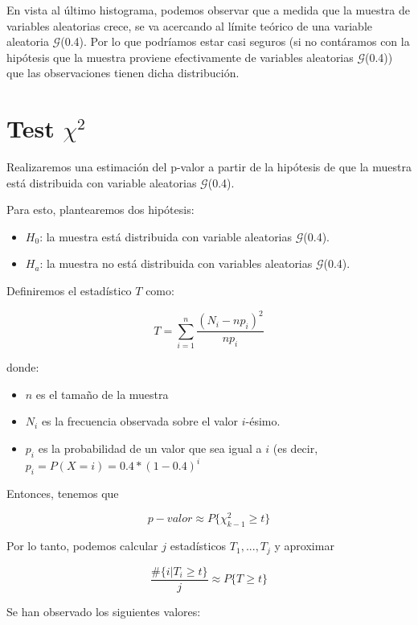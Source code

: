 \documentclass[a4paper,10pt]{article}
\begin{document}
En vista al último histograma, podemos observar que a medida que la muestra de variables aleatorias
crece, se va acercando al límite teórico de una variable aleatoria $\mathcal{G}$(0.4).
Por lo que podríamos estar casi seguros (si no contáramos con la hipótesis que la muestra proviene
efectivamente de variables aleatorias $\mathcal{G}$(0.4)) que las observaciones tienen
dicha distribución.

\pagebreak

\section*{Test $\chi^2$}

\vspace{0.4in}

Realizaremos una estimación del p-valor a partir de la hipótesis de que la muestra está distribuida
con variable aleatorias $\mathcal{G}$(0.4).

Para esto, plantearemos dos hipótesis:

\begin{itemize}
 \item $H_0$: la muestra está distribuida con variable aleatorias $\mathcal{G}$(0.4).
 \item $H_a$: la muestra no está distribuida con variables aleatorias $\mathcal{G}$(0.4).
\end{itemize}

Definiremos el estadístico $T$ como:

\[T = \sum\limits_{i=1}^n \frac{(N_i - n p_i)^2}{n p_i}\]

donde:

\begin{itemize}
 \item $n$ es el tamaño de la muestra
 \item $N_i$ es la frecuencia observada sobre el valor $i$-ésimo.
 \item $p_i$ es la probabilidad de un valor que sea igual a $i$ (es decir, $p_i = P(X=i) = 0.4*(1 - 0.4)^i$
\end{itemize}

Entonces, tenemos que

\[p-valor \approx P\{\chi^2_{k-1} \geq t\}\]

Por lo tanto, podemos calcular $j$ estadísticos $T_1,...,T_j$
y aproximar

\[\frac{\#\{i | T_i \geq t\}}{j} \approx P\{T \geq t\}\]

Se han observado los siguientes valores:
\end{document}
